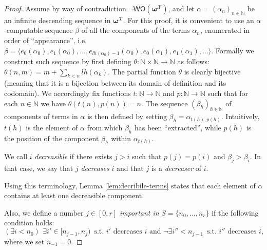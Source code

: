 \documentclass[10pt,a4paper]{amsart}
\newcommand\Nat{\mathbb{N}}
\newcommand\WO{\mathsf{WO}}
\newcommand\boldomega{\pmb{\omega}}
\newcommand{\LoX}{\mathcal{X}}
\begin{document}
\begin{proof}
Assume by way of contradiction $\neg\WO(\boldomega^\LoX)$, and let $\alpha= (\alpha_n)_{n\in \Nat}$ 
be an infinite descending sequence in $\boldomega^\LoX$. 
For this proof, it is convenient to use an $\alpha$-computable sequence $\beta$ of all the components of the terms $\alpha_n$, enumerated in order of ``appearance'', i.e. $\beta = \langle e_0(\alpha_0), e_1(\alpha_0), \dots, e_{lh(\alpha_0)-1}(\alpha_0), e_0(\alpha_1), e_1(\alpha_1), \dots \rangle$. Formally we construct such sequence by first defining $\theta : \Nat\times\Nat\to \Nat$ as follows: $\theta(n,m)= m + \sum_{k < n} lh(\alpha_k)$. The partial function $\theta$ is clearly bijective (meaning that it is a bijection between its domain of definition and its codomain). We accordingly fix functions $t: \Nat \to \Nat$ and $p:\Nat\to\Nat$ such that for each $n\in\Nat$ we have
$\theta(t(n),p(n))=n$. The sequence $(\beta_h)_{h\in\Nat}$ of components of terms in $\alpha$ is then defined
by setting $\beta_h = \alpha_{t(h),p(h)}$. Intuitively, $t(h)$ is the element of $\alpha$ from which $\beta_h$ has been ``extracted'', while $p(h)$ is the position of the component $\beta_h$ within $\alpha_{t(h)}$.


We call $i$ \emph{decreasible} if there exists $j>i$ such that $p(j)=p(i)$ and $\beta_j > \beta_i$. In that case, we say that $j$ \emph{decreases} $i$ and that $j$ is a \emph{decreaser} of $i$. 

Using this terminology, Lemma \ref{lem:decribile-terms} states that each element of $\alpha$ contains at least one decreasible component.

Also, we define a number $j\in [0,r]$ \textit{important in} $S=\{n_0, \ldots,n_r\}$ if the following condition holds:
$$
(\exists i< n_0)\ \,\exists i' \in [n_{j-1}, n_j)\, \text{ s.t. } i' \text{ decreases } i \text{  and } \neg\exists i'' < n_{j-1}\, \text{  s.t. } i'' \text{  decreases } i,$$
where we set  $n_{-1}=0$.
\medskip


\end{proof}
\end{document}
